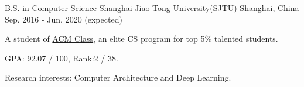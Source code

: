 


\begin{cventries}

\cventry
{B.S. in Computer Science}
{\href{http://en.sjtu.edu.cn/}{Shanghai Jiao Tong University(SJTU)}}
{Shanghai, China}
{Sep. 2016 - Jun. 2020 (expected)}
{
	\begin{cvitems}
		\item {A student of \href{https://acm.sjtu.edu.cn}{ACM Class}, an elite CS program for top 5\% talented students.}
        \item {GPA: 92.07 / 100, Rank:2 / 38.}
        \item {Research interests: Computer Architecture and Deep Learning.}
	\end{cvitems}
}

\end{cventries}